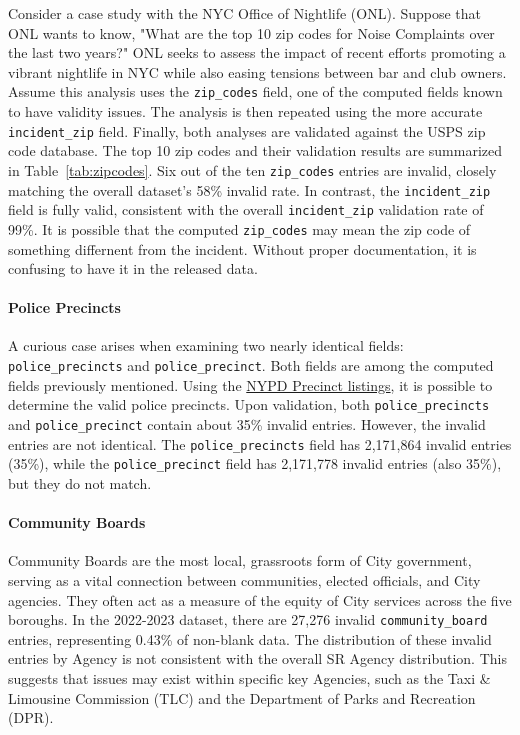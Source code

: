 \documentclass[linenumber]{jdsart}
\begin{document}
Consider a case study with the NYC Office of Nightlife (ONL). Suppose 
that ONL wants to know, "What are the top 10 zip codes for Noise 
Complaints over the last two years?" ONL seeks to assess the impact 
of recent efforts promoting a vibrant nightlife in NYC while also 
easing tensions between bar and club owners. Assume this analysis uses 
the \texttt{zip\_codes} field, one of the computed fields known to have 
validity issues. The analysis is then repeated using the more accurate 
\texttt{incident\_zip} field. Finally, both analyses are validated 
against the USPS zip code database. The top 10 zip codes and their 
validation results are summarized in Table~\ref{tab:zipcodes}. Six out 
of the ten \texttt{zip\_codes} entries are invalid, closely matching 
the overall dataset's 58\% invalid rate. In contrast, the 
\texttt{incident\_zip} field is fully valid, consistent with the 
overall \texttt{incident\_zip} validation rate of 99\%.
It is possible that the computed \texttt{zip\_codes} may mean the zip
code of something differnent from the incident. Without proper
documentation, it is confusing to have it in the released data.


\paragraph{Police Precincts}
\label{sec:police-precincts}
A curious case arises when examining two nearly identical fields: 
\texttt{police\_precincts} and \texttt{police\_precinct}. Both fields 
are among the computed fields previously mentioned. Using the 
\href{https://www.nyc.gov/site/nypd/bureaus/patrol/precincts-landing.page}
{NYPD Precinct listings}, it is possible to determine the valid police 
precincts. Upon validation, both \texttt{police\_precincts} and 
\texttt{police\_precinct} contain about 35\% invalid entries. However, 
the invalid entries are not identical. The \texttt{police\_precincts} 
field has 2,171,864 invalid entries (35\%), while the 
\texttt{police\_precinct} field has 2,171,778 invalid entries (also 
35\%), but they do not match.



\paragraph{Community Boards}
\label{sec:communityboards}
Community Boards are the most local, grassroots form of City government, 
serving as a vital connection between communities, elected officials, 
and City agencies. They often act as a measure of the equity of City 
services across the five boroughs. In the 2022-2023 dataset, there are 
27,276 invalid \texttt{community\_board} entries, representing 0.43\% 
of non-blank data. The distribution of these invalid entries by Agency 
is not consistent with the overall SR Agency 
distribution. This suggests that issues may exist within specific key 
Agencies, such as the Taxi \& Limousine Commission (TLC) and the 
Department of Parks and Recreation (DPR).
\end{document}
